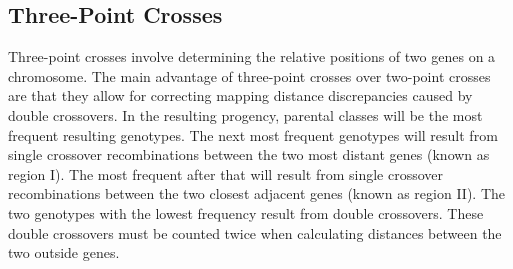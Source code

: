 \documentclass[12pt,titlepage]{article}
\begin{document}
      \subsection{Three-Point Crosses}
        Three-point crosses involve determining the relative positions of two genes on a chromosome. The main advantage of three-point crosses over two-point
        crosses are that they allow for correcting mapping distance discrepancies caused by double crossovers. In the resulting progency, parental classes
        will be the most frequent resulting genotypes. The next most frequent genotypes will result from single crossover recombinations between the two most
        distant genes (known as region I). The most frequent after that will result from single crossover recombinations between the two closest adjacent
        genes (known as region II). The two genotypes with the lowest frequency result from double crossovers. These double crossovers must be counted twice
        when calculating distances between the two outside genes.
\end{document}
